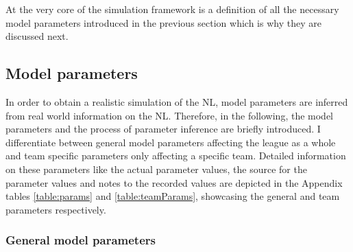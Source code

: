 \documentclass[12pt, a4paper]{article}
\begin{document}
\noindent
At the very core of the simulation framework is a definition of all the necessary model parameters introduced in the previous section which is why they are discussed next.

\subsection{Model parameters}

In order to obtain a realistic simulation of the NL, model parameters are inferred from real world information on the NL. Therefore, in the following, the model parameters and the process of parameter inference are briefly introduced. I differentiate between general model parameters affecting the league as a whole and team specific parameters only affecting a specific team. Detailed information on these parameters like the actual parameter values, the source for the parameter values and notes to the recorded values are depicted in the Appendix tables \ref{table:params} and \ref{table:teamParams}, showcasing the general and team parameters respectively. 

\subsubsection{General model parameters}
\end{document}
